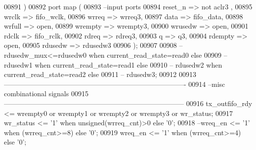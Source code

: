 \begin{DoxyCode}
00891   \textcolor{vhdlchar}{)}  
00892   \textcolor{keywordflow}{port} \textcolor{keywordflow}{map} (
00893 \textcolor{keyword}{      --input ports }
00894       reset_n       => \textcolor{keywordflow}{not} aclr3 , 
00895       wrclk         => fifo_wclk,
00896       wrreq         => wrreq3,
00897       data          => fifo_data, 
00898       wrfull        => \textcolor{keywordflow}{open},
00899         wrempty       => wrempty3, 
00900       wrusedw       => \textcolor{keywordflow}{open},
00901       rdclk          => fifo_rclk,
00902       rdreq         => rdreq3,
00903       q             => q3,
00904       rdempty       => \textcolor{keywordflow}{open},
00905       rdusedw       => rdusedw3     
00906         \textcolor{vhdlchar}{)};
00907   
00908 \textcolor{keyword}{--   rdusedw\_mux<=rdusedw0 when current\_read\_state=read0 else }
00909 \textcolor{keyword}{--                rdusedw1 when current\_read\_state=read1 else }
00910 \textcolor{keyword}{--                rdusedw2 when current\_read\_state=read2 else }
00911 \textcolor{keyword}{--                rdusedw3;}
00912 
00913 \textcolor{keyword}{-------------------------------------------------------------------------------}
00914 \textcolor{keyword}{--misc combinational signals}
00915 \textcolor{keyword}{------------------------------------------------------------------------------   }
00916 \textcolor{vhdlchar}{tx_outfifo_rdy}  \textcolor{vhdlchar}{<=}  \textcolor{vhdlchar}{wrempty0} \textcolor{keywordflow}{or} \textcolor{vhdlchar}{wrempty1} \textcolor{keywordflow}{or} \textcolor{vhdlchar}{wrempty2} \textcolor{keywordflow}{or} \textcolor{vhdlchar}{wrempty3} \textcolor{keywordflow}{or} \textcolor{vhdlchar}{wr_status};
00917 \textcolor{vhdlchar}{wr_status}       \textcolor{vhdlchar}{<=} \textcolor{vhdlchar}{'}\textcolor{vhdllogic}{}\textcolor{vhdllogic}{1}\textcolor{vhdlchar}{'} \textcolor{keywordflow}{when} \textcolor{comment}{unsigned}\textcolor{vhdlchar}{(}\textcolor{vhdlchar}{wrreq_cnt}\textcolor{vhdlchar}{)}\textcolor{vhdlchar}{>}\textcolor{vhdllogic}{}\textcolor{vhdllogic}{0} \textcolor{keywordflow}{else} \textcolor{vhdlchar}{'}\textcolor{vhdllogic}{}\textcolor{vhdllogic}{0}\textcolor{vhdlchar}{'};
00918 \textcolor{keyword}{--wreq\_en           <= '1' when  (wrreq\_cnt>=8) else '0'; }
00919 \textcolor{vhdlchar}{wreq_en}         \textcolor{vhdlchar}{<=} \textcolor{vhdlchar}{'}\textcolor{vhdllogic}{}\textcolor{vhdllogic}{1}\textcolor{vhdlchar}{'} \textcolor{keywordflow}{when}  \textcolor{vhdlchar}{(}\textcolor{vhdlchar}{wrreq_cnt}\textcolor{vhdlchar}{>=}\textcolor{vhdllogic}{}\textcolor{vhdllogic}{4}\textcolor{vhdlchar}{)} \textcolor{keywordflow}{else} \textcolor{vhdlchar}{'}\textcolor{vhdllogic}{}\textcolor{vhdllogic}{0}\textcolor{vhdlchar}{'}; 

\end{DoxyCode}
